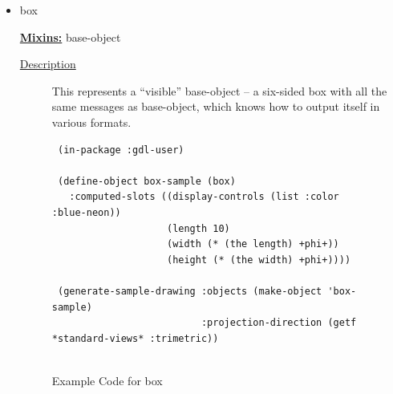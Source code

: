 \documentclass [11pt]{book}
\begin{document}
\begin{itemize}
\begin{description}
\end{description}







\item {}box


\textbf{
\underline{Mixins:}} base-object





\begin{description}

\item [
\underline{Description}]


This represents a ``visible'' base-object -- a six-sided box with all the same
messages as base-object, which knows how to output itself in various formats.



\end{description}




\begin{figure}
\begin{lrbox}{\boxedverb}
\begin{minipage}{\linewidth}
{\small

\begin{verbatim}
 (in-package :gdl-user)

 (define-object box-sample (box)
   :computed-slots ((display-controls (list :color :blue-neon))
                    (length 10)
                    (width (* (the length) +phi+))
                    (height (* (the width) +phi+))))

 (generate-sample-drawing :objects (make-object 'box-sample)
                          :projection-direction (getf *standard-views* :trimetric))


\end{verbatim}}
\end{minipage}
\end{lrbox}
\fbox{\usebox{\boxedverb}}

\caption{Example Code for box}

\label{fig:example-code-box}

\end{figure}


\end{itemize}
\end{document}
